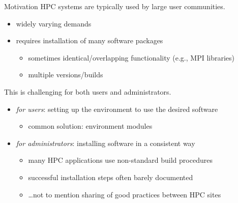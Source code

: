 \documentclass[10pt,xcolor={usenames,dvipsnames}]{beamer}
\begin{document}
\begin{frame}{Motivation}
    HPC systems are typically used by large user communities.
    \begin{itemize}
        \item
            widely varying demands
        \item
            requires installation of many software packages
            \begin{itemize}
                \item
                    sometimes identical/overlapping functionality (e.g., MPI libraries)
                \item
                    multiple versions/builds
            \end{itemize}
    \end{itemize}
    \vspace{1ex}
    This is challenging for both users and administrators.
    \begin{itemize}
        \item
            \emph{for users}: setting up the environment to use the desired software
            \begin{itemize}
                \item
                    common solution: environment modules
            \end{itemize}
        \item
            \emph{for administrators}: installing software in a consistent way
            \begin{itemize}
                \item
                    many HPC applications use non-standard build procedures
                \item
                    successful installation steps often barely documented
                \item
                    \ldots not to mention sharing of good practices between HPC sites
            \end{itemize}
    \end{itemize}
\end{frame}

\end{document}
